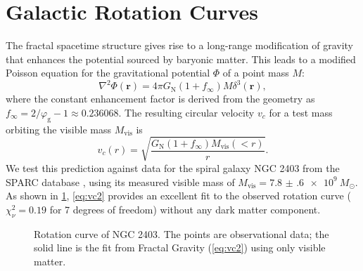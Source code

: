 \documentclass[
  10pt,prd,aps,twocolumn,superscriptaddress,
  nofootinbib,floatfix,tightenlines
]{revtex4-2}
\newcommand{\GN}{G_{\mathrm{N}}}
\newcommand{\phig}{\varphi_{\mathrm{g}}} %
\begin{document}
\section{Galactic Rotation Curves}
\label{sec:rotcurve}
The fractal spacetime structure gives rise to a long-range modification of gravity that enhances the potential sourced by baryonic matter. This leads to a modified Poisson equation for the gravitational potential \(\Phi\) of a point mass \(M\):
\begin{equation}
\nabla^2\Phi(\mathbf{r}) = 4\pi\GN(1+f_\infty)M\delta^3(\mathbf{r}),
\end{equation}
where the constant enhancement factor is derived from the geometry as \(f_\infty = 2/\phig-1 \approx 0.236068\). The resulting circular velocity \(v_c\) for a test mass orbiting the visible mass \(M_{\text{vis}}\) is
\begin{equation}
v_c(r) = \sqrt{\frac{\GN(1+f_\infty)M_{\text{vis}}(<r)}{r}}.
\label{eq:vc2}
\end{equation}
We test this prediction against data for the spiral galaxy NGC 2403 from the SPARC database \cite{McGaugh:2016}, using its measured visible mass of \(M_{\text{vis}} = \SI{7.8(6)e9}{M_\odot}\). As shown in \cref{fig:rot_curve}, \cref{eq:vc2} provides an excellent fit to the observed rotation curve (\(\chi^2_\nu=0.19\) for 7 degrees of freedom) without any dark matter component.

\begin{figure}[t]
\centering
{}
\caption{Rotation curve of NGC 2403. The points are observational data; the solid line is the fit from Fractal Gravity (\cref{eq:vc2}) using only visible matter.}
\label{fig:rot_curve}
\end{figure}
\end{document}
